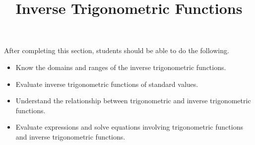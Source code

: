 \documentclass{ximera}
\title{Inverse Trigonometric Functions}
\begin{document}
\begin{abstract} 
\end{abstract}

\maketitle

\begin{sectionOutcomes}
After completing this section, students should be able to do the following.

\begin{itemize}
	\item Know the domains and ranges of the inverse trigonometric functions.
	\item Evaluate inverse trigonometric functions of standard values.
	\item Understand the relationship between trigonometric and inverse trigonometric functions.
	\item Evaluate expressions and solve equations involving
          trigonometric functions and inverse trigonometric functions.
\end{itemize}
\end{sectionOutcomes}
\end{document}
